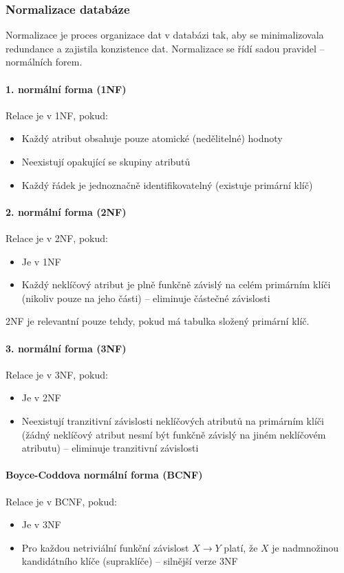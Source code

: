 \documentclass[12pt,a4paper]{article}
\begin{document}
\subsubsection{Normalizace databáze}

Normalizace je proces organizace dat v databázi tak, aby se minimalizovala redundance a zajistila
konzistence dat. Normalizace se řídí sadou pravidel -- normálních forem.

\paragraph{1. normální forma (1NF)}
Relace je v 1NF, pokud:
\begin{itemize}
  \item Každý atribut obsahuje pouze atomické (nedělitelné) hodnoty
  \item Neexistují opakující se skupiny atributů
  \item Každý řádek je jednoznačně identifikovatelný (existuje primární klíč)
\end{itemize}

\paragraph{2. normální forma (2NF)}
Relace je v 2NF, pokud:
\begin{itemize}
  \item Je v 1NF
  \item Každý neklíčový atribut je plně funkčně závislý na celém primárním klíči (nikoliv pouze
    na jeho části) -- eliminuje částečné závislosti
\end{itemize}
2NF je relevantní pouze tehdy, pokud má tabulka složený primární klíč.

\paragraph{3. normální forma (3NF)}
Relace je v 3NF, pokud:
\begin{itemize}
  \item Je v 2NF
  \item Neexistují tranzitivní závislosti neklíčových atributů na primárním klíči (žádný neklíčový
    atribut nesmí být funkčně závislý na jiném neklíčovém atributu) -- eliminuje tranzitivní závislosti
\end{itemize}

\paragraph{Boyce-Coddova normální forma (BCNF)}
Relace je v BCNF, pokud:
\begin{itemize}
  \item Je v 3NF
  \item Pro každou netriviální funkční závislost $X \to Y$ platí, že $X$ je nadmnožinou kandidátního
    klíče (supraklíče) -- silnější verze 3NF
\end{itemize}
\end{document}

